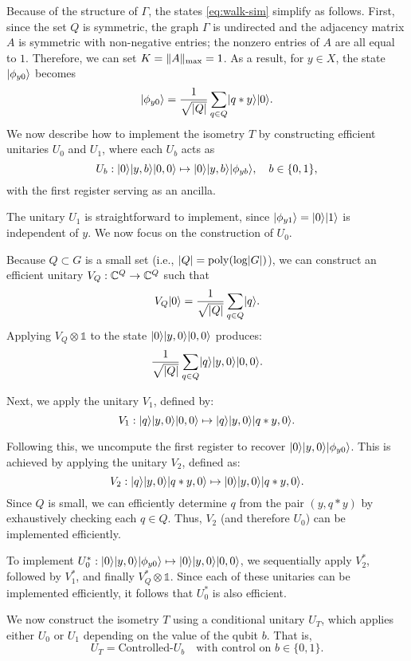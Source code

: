 \documentclass[11pt]{article}
\theoremstyle{definition}
\begin{document}
Because of the structure of $\Gamma$, the states \eqref{eq:walk-sim} simplify as follows. First, since the set $Q$ is symmetric, the graph $\Gamma$ is undirected and the adjacency matrix $A$ is symmetric with non-negative entries; the nonzero entries of $A$ are all equal to $1$. Therefore, we can set $K = \lVert A\rVert_{\mathrm{max}} = 1$. As a result, for $y \in X$, the state $\lvert\phi_{y0}\rangle$ becomes
\[ \lvert\phi_{y0}\rangle = \frac{1}{\sqrt{\lvert Q\rvert}} \sum_{q \in Q} \lvert q * y\rangle \lvert0\rangle. \]
We now describe how to implement the isometry \( T \) by constructing efficient unitaries \( U_0 \) and \( U_1 \), where each \( U_b \) acts as
\[
U_b : \lvert0\rangle \lvert y, b\rangle \lvert0, 0\rangle \mapsto \lvert0\rangle \lvert y, b\rangle \lvert\phi_{yb}\rangle, \quad b \in \{0, 1\},
\]
with the first register serving as an ancilla.

The unitary \( U_1 \) is straightforward to implement, since \( \lvert\phi_{y1}\rangle = \lvert0\rangle \lvert1\rangle \) is independent of \( y \). We now focus on the construction of \( U_0 \).

Because \( Q \subset G \) is a small set (i.e., \( \lvert Q\rvert = \operatorname{poly}(\log \lvert G\rvert) \)), we can construct an efficient unitary \( V_Q : \mathbb{C}^Q \to \mathbb{C}^Q \) such that
\[
V_Q \lvert0\rangle = \frac{1}{\sqrt{\lvert Q\rvert}} \sum_{q \in Q} \lvert q\rangle.
\]
Applying \( V_Q \otimes \mathds{1} \) to the state \( \lvert0\rangle \lvert y, 0\rangle \lvert0, 0\rangle \) produces:
\[
\frac{1}{\sqrt{\lvert Q\rvert}} \sum_{q \in Q} \lvert q\rangle \lvert y, 0\rangle \lvert0, 0\rangle.
\]

Next, we apply the unitary \( V_1 \), defined by:
\[
V_1 : \lvert q\rangle \lvert y, 0\rangle \lvert0, 0\rangle \mapsto \lvert q\rangle \lvert y, 0\rangle \lvert q * y, 0\rangle.
\]

Following this, we uncompute the first register to recover \( \lvert0\rangle \lvert y, 0\rangle \lvert\phi_{y0}\rangle \). This is achieved by applying the unitary \( V_2 \), defined as:
\[
V_2 : \lvert q\rangle \lvert y, 0\rangle \lvert q * y, 0\rangle \mapsto \lvert0\rangle \lvert y, 0\rangle \lvert q * y, 0\rangle.
\]
Since \( Q \) is small, we can efficiently determine \( q \) from the pair \( (y, q * y) \) by exhaustively checking each \( q \in Q \). Thus, \( V_2 \) (and therefore \( U_0 \)) can be implemented efficiently.


To implement \( U_0^* : \lvert0\rangle \lvert y, 0\rangle \lvert\phi_{y0}\rangle \mapsto \lvert0\rangle \lvert y, 0\rangle \lvert0, 0\rangle \), we sequentially apply \( V_2^* \), followed by \( V_1^* \), and finally \( V_Q^* \otimes \mathds{1} \). Since each of these unitaries can be implemented efficiently, it follows that \( U_0^* \) is also efficient.

We now construct the isometry \( T \) using a conditional unitary \( U_T \), which applies either \( U_0 \) or \( U_1 \) depending on the value of the qubit \( b \). That is,
\[
U_T = \text{Controlled-}U_b \quad \text{with control on } b \in \{0,1\}.
\]
\end{document}
